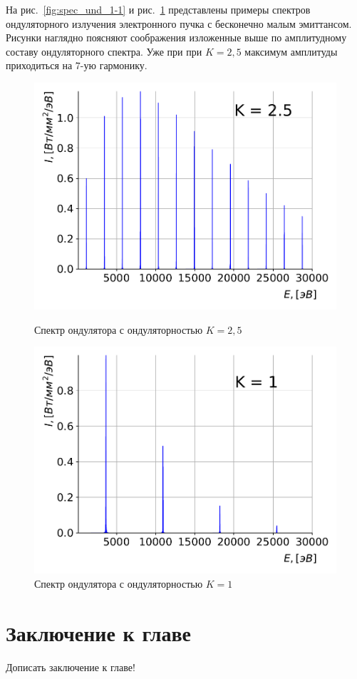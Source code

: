 На рис.~\ref{fig:spec_und_1-1} и рис.~\ref{fig:spec_und_1-2} представлены примеры спектров ондуляторного излучения электронного пучка с бесконечно малым эмиттансом. Рисунки наглядно поясняют соображения изложенные выше по амплитудному составу ондуляторного спектра. Уже при при $K = 2,5$ максимум амплитуды приходиться на $7$-ую гармонику.
\begin{figure}[ht!]
	\begin{minipage}{0.49\textwidth}
		\centering
		\includegraphics[width=\textwidth]{pic/spec_und_1-1.pdf}
		\caption{Спектр ондулятора с ондуляторностью $K = 2,5$}
		\label{fig:spec_und_1-1}
	\end{minipage}
	\begin{minipage}{0.49\textwidth}
		\centering
		\includegraphics[width=\textwidth]{pic/spec_und_1-2.pdf}
		\caption{Спектр ондулятора с ондуляторностью $K = 1$}
		\label{fig:spec_und_1-2}
	\end{minipage}    
\end{figure}

\section{Заключение к главе}
Дописать заключение к главе!









